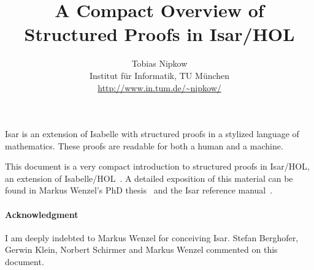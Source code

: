 \documentclass[11pt,a4paper]{article}
\begin{document}
\title{A Compact Overview of Structured Proofs in Isar/HOL}
\author{Tobias Nipkow\\Institut f{\"u}r Informatik, TU M{\"u}nchen\\
 {\small\url{http://www.in.tum.de/~nipkow/}}}
\date{}
\maketitle

\noindent
Isar is an extension of Isabelle with structured proofs in a
stylized language of mathematics. These proofs are readable for both a human
and a machine.

This document is a very compact introduction to structured proofs in
Isar/HOL, an extension of Isabelle/HOL~\cite{LNCS2283}. A detailed
exposition of this material can be found in Markus Wenzel's PhD
thesis~\cite{Wenzel-PhD} and the Isar reference manual~\cite{Isar-Ref-Man}.



%


{\small
\paragraph{Acknowledgment}
I am deeply indebted to Markus Wenzel for conceiving Isar. Stefan Berghofer,
Gerwin Klein, Norbert Schirmer and Markus Wenzel commented on this document.
}

\begingroup
 \small\raggedright\frenchspacing

\endgroup
\end{document}
